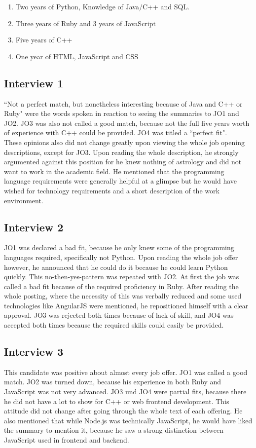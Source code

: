 \begin{enumerate}
\item Two years of Python, Knowledge of Java/C++ and SQL.
\item Three years of Ruby and 3 years of JavaScript
\item Five years of C++
\item One year of HTML, JavaScript and CSS
\end{enumerate}

\subsection{Interview 1}
``Not a perfect match, but nonetheless interesting because of Java and C++ or Ruby" were the words spoken in reaction to seeing the summaries to JO1 and JO2. JO3 was also not called a good match, because not the full five years worth of experience with C++ could be provided. JO4 was titled a ``perfect fit".\\
These opinions also did not change greatly upon viewing the whole job opening descriptions, except for JO3. Upon reading the whole description, he strongly argumented against this position for he knew nothing of astrology and did not want to work in the academic field. He mentioned that the programming language requirements were generally helpful at a glimpse but he would have wished for technology requirements and a short description of the work environment.

\subsection{Interview 2}
JO1 was declared a bad fit, because he only knew some of the programming languages required, specifically not Python. Upon reading the whole job offer however, he announced that he could do it because he could learn Python quickly. This no-then-yes-pattern was repeated with JO2. At first the job was called a bad fit because of the required proficiency in Ruby. After reading the whole posting, where the necessity of this was verbally reduced and some used technologies like AngularJS were mentioned, he repositioned himself with a clear approval. JO3 was rejected both times because of lack of skill, and JO4 was accepted both times because the required skills could easily be provided.

\subsection{Interview 3}
This candidate was positive about almost every job offer. JO1 was called a good match. JO2 was turned down, because his experience in both Ruby and JavaScript was not very advanced. JO3 und JO4 were partial fits, because there he did not have a lot to show for C++ or web frontend development. This attitude did not change after going through the whole text of each offering. He also mentioned that while Node.js was technically JavaScript, he would have liked the summary to mention it, because he saw a strong distinction between JavaScript used in frontend and backend.

